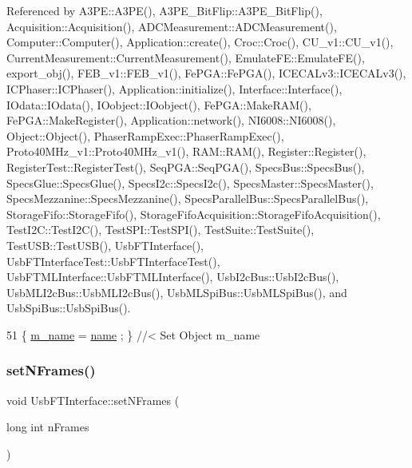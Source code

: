 Referenced by A3\+P\+E\+::\+A3\+P\+E(), A3\+P\+E\+\_\+\+Bit\+Flip\+::\+A3\+P\+E\+\_\+\+Bit\+Flip(), Acquisition\+::\+Acquisition(), A\+D\+C\+Measurement\+::\+A\+D\+C\+Measurement(), Computer\+::\+Computer(), Application\+::create(), Croc\+::\+Croc(), C\+U\+\_\+v1\+::\+C\+U\+\_\+v1(), Current\+Measurement\+::\+Current\+Measurement(), Emulate\+F\+E\+::\+Emulate\+F\+E(), export\+\_\+obj(), F\+E\+B\+\_\+v1\+::\+F\+E\+B\+\_\+v1(), Fe\+P\+G\+A\+::\+Fe\+P\+G\+A(), I\+C\+E\+C\+A\+Lv3\+::\+I\+C\+E\+C\+A\+Lv3(), I\+C\+Phaser\+::\+I\+C\+Phaser(), Application\+::initialize(), Interface\+::\+Interface(), I\+Odata\+::\+I\+Odata(), I\+Oobject\+::\+I\+Oobject(), Fe\+P\+G\+A\+::\+Make\+R\+A\+M(), Fe\+P\+G\+A\+::\+Make\+Register(), Application\+::network(), N\+I6008\+::\+N\+I6008(), Object\+::\+Object(), Phaser\+Ramp\+Exec\+::\+Phaser\+Ramp\+Exec(), Proto40\+M\+Hz\+\_\+v1\+::\+Proto40\+M\+Hz\+\_\+v1(), R\+A\+M\+::\+R\+A\+M(), Register\+::\+Register(), Register\+Test\+::\+Register\+Test(), Seq\+P\+G\+A\+::\+Seq\+P\+G\+A(), Specs\+Bus\+::\+Specs\+Bus(), Specs\+Glue\+::\+Specs\+Glue(), Specs\+I2c\+::\+Specs\+I2c(), Specs\+Master\+::\+Specs\+Master(), Specs\+Mezzanine\+::\+Specs\+Mezzanine(), Specs\+Parallel\+Bus\+::\+Specs\+Parallel\+Bus(), Storage\+Fifo\+::\+Storage\+Fifo(), Storage\+Fifo\+Acquisition\+::\+Storage\+Fifo\+Acquisition(), Test\+I2\+C\+::\+Test\+I2\+C(), Test\+S\+P\+I\+::\+Test\+S\+P\+I(), Test\+Suite\+::\+Test\+Suite(), Test\+U\+S\+B\+::\+Test\+U\+S\+B(), Usb\+F\+T\+Interface(), Usb\+F\+T\+Interface\+Test\+::\+Usb\+F\+T\+Interface\+Test(), Usb\+F\+T\+M\+L\+Interface\+::\+Usb\+F\+T\+M\+L\+Interface(), Usb\+I2c\+Bus\+::\+Usb\+I2c\+Bus(), Usb\+M\+L\+I2c\+Bus\+::\+Usb\+M\+L\+I2c\+Bus(), Usb\+M\+L\+Spi\+Bus\+::\+Usb\+M\+L\+Spi\+Bus(), and Usb\+Spi\+Bus\+::\+Usb\+Spi\+Bus().


\begin{DoxyCode}
51 \{ \hyperlink{classObject_a8b83c95c705d2c3ba0d081fe1710f48d}{m\_name}  = \hyperlink{classObject_a300f4c05dd468c7bb8b3c968868443c1}{name}  ; \} \textcolor{comment}{//< Set Object m\_name}
\end{DoxyCode}
\mbox{\label{classUsbFTInterface_a247a19741032fa0f330cc3f6c17ed08b}} 
\subsubsection{\texorpdfstring{set\+N\+Frames()}{setNFrames()}}
{\footnotesize\ttfamily void Usb\+F\+T\+Interface\+::set\+N\+Frames (\begin{DoxyParamCaption}\item[{long int}]{n\+Frames }\end{DoxyParamCaption})\hspace{0.3cm}{\ttfamily [inline]}}

